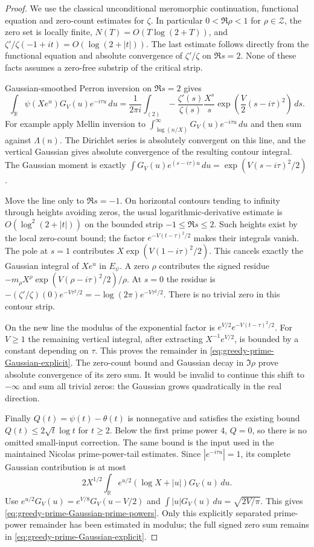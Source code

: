 \documentclass[11pt]{article}
\theoremstyle{definition}
\begin{document}
\begin{proof}
We use the classical unconditional meromorphic continuation,
functional equation and zero-count estimates for $\zeta$.
In particular $0<\Re\rho<1$ for $\rho\in\mathcal Z$,
the zero set is locally finite,
$N(T)=O(T\log(2+T))$, and
$\zeta'/\zeta(-1+it)=O(\log(2+|t|))$.
The last estimate follows directly from the functional equation and
absolute convergence of $\zeta'/\zeta$ on $\Re s=2$.
None of these facts assumes a zero-free substrip of the critical strip.

Gaussian-smoothed Perron inversion on $\Re s=2$ gives
\[
 \int_{\mathbb R}\psi(Xe^u)G_V(u)e^{-i\tau u}\,du
 =
 \frac1{2\pi i}\int_{(2)}
       -\frac{\zeta'(s)}{\zeta(s)}
        \frac{X^s}{s}
        \exp\left(\frac V2(s-i\tau)^2\right)\,ds .
\]
For example apply Mellin inversion to
$\int_{\log(n/X)}^\infty G_V(u)e^{-i\tau u}\,du$
and then sum against $\Lambda(n)$.
The Dirichlet series is absolutely convergent on this line,
and the vertical Gaussian gives absolute convergence of the
resulting contour integral.
The Gaussian moment is exactly
$\int G_V(u)e^{(s-i\tau)u}\,du
=\exp(V(s-i\tau)^2/2)$.

Move the line only to $\Re s=-1$.
On horizontal contours tending to infinity through heights avoiding
zeros, the usual logarithmic-derivative estimate is
$O(\log^2(2+|t|))$ on the bounded strip $-1\le\Re s\le2$.
Such heights exist by the local zero-count bound; the factor
$e^{-V(t-\tau)^2/2}$ makes their integrals vanish.
The pole at $s=1$ contributes
$X\exp(V(1-i\tau)^2/2)$.
This cancels exactly the Gaussian integral of $Xe^u$ in
$E_\psi$.
A zero $\rho$ contributes the signed residue
$-m_\rho X^\rho\exp(V(\rho-i\tau)^2/2)/\rho$.
At $s=0$ the residue is
$-(\zeta'/\zeta)(0)e^{-V\tau^2/2}
=-\log(2\pi)e^{-V\tau^2/2}$.
There is no trivial zero in this contour strip.

On the new line the modulus of the exponential factor is
$e^{V/2}e^{-V(t-\tau)^2/2}$.
For $V\ge1$ the remaining vertical integral, after extracting
$X^{-1}e^{V/2}$, is bounded by a constant depending on $\tau$.
This proves the remainder in
\eqref{eq:greedy-prime-Gaussian-explicit}.
The zero-count bound and Gaussian decay in $\Im\rho$ prove absolute
convergence of its zero sum.
It would be invalid to continue this shift to $-\infty$ and sum all
trivial zeros: the Gaussian grows quadratically in the real direction.

Finally $Q(t)=\psi(t)-\theta(t)$ is nonnegative and satisfies the
existing bound $Q(t)\le2\sqrt t\log t$ for $t\ge2$.
Below the first prime power $4$, $Q=0$, so there is no omitted
small-input correction.
The same bound is the input used in the maintained
Nicolas prime-power-tail estimates.
Since $|e^{-i\tau u}|=1$, its complete Gaussian contribution is at most
\[
 2X^{1/2}\int_{\mathbb R}
       e^{u/2}(\log X+|u|)G_V(u)\,du .
\]
Use
$e^{u/2}G_V(u)=e^{V/8}G_V(u-V/2)$ and
$\int|u|G_V(u)\,du=\sqrt{2V/\pi}$.
This gives \eqref{eq:greedy-prime-Gaussian-prime-powers}.
Only this explicitly separated prime-power remainder has been
estimated in modulus; the full signed zero sum remains in
\eqref{eq:greedy-prime-Gaussian-explicit}.
\end{proof}
\end{document}
